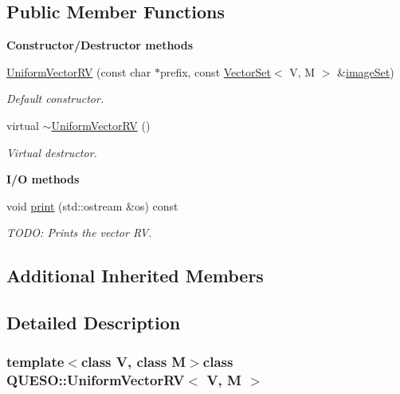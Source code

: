 \subsection*{Public Member Functions}
\begin{Indent}{\bf Constructor/\-Destructor methods}\par
\begin{DoxyCompactItemize}
\item 
\hyperlink{class_q_u_e_s_o_1_1_uniform_vector_r_v_a088f61731c268c102b4a21c503cc9844}{Uniform\-Vector\-R\-V} (const char $\ast$prefix, const \hyperlink{class_q_u_e_s_o_1_1_vector_set}{Vector\-Set}$<$ V, M $>$ \&\hyperlink{class_q_u_e_s_o_1_1_base_vector_r_v_aa4dd2f036228eac1f945bacc7147a922}{image\-Set})
\begin{DoxyCompactList}\small\item\em Default constructor. \end{DoxyCompactList}\item 
virtual \hyperlink{class_q_u_e_s_o_1_1_uniform_vector_r_v_a8ff6273a758739c706e8ffbaf8ca4b26}{$\sim$\-Uniform\-Vector\-R\-V} ()
\begin{DoxyCompactList}\small\item\em Virtual destructor. \end{DoxyCompactList}\end{DoxyCompactItemize}
\end{Indent}
\begin{Indent}{\bf I/\-O methods}\par
\begin{DoxyCompactItemize}
\item 
void \hyperlink{class_q_u_e_s_o_1_1_uniform_vector_r_v_ab6dee885e568635b7b7e9675b4e66833}{print} (std\-::ostream \&os) const 
\begin{DoxyCompactList}\small\item\em T\-O\-D\-O\-: Prints the vector R\-V. \end{DoxyCompactList}\end{DoxyCompactItemize}
\end{Indent}
\subsection*{Additional Inherited Members}


\subsection{Detailed Description}
\subsubsection*{template$<$class V, class M$>$class Q\-U\-E\-S\-O\-::\-Uniform\-Vector\-R\-V$<$ V, M $>$}

